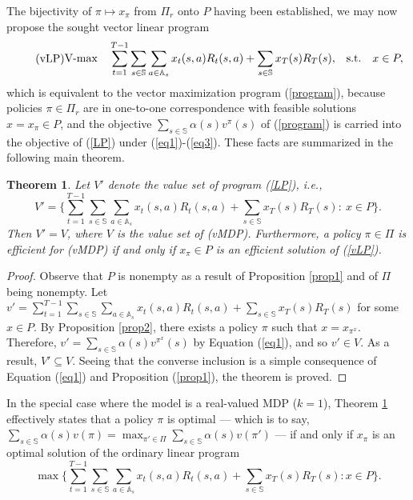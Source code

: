 \documentclass{article}
\newtheorem{theorem}{Theorem}[section]
\theoremstyle{definition}
\numberwithin{equation}{section}
\begin{document}
{The bijectivity of $\pi \mapsto x_\pi$ from $\Pi_r$ onto $P$ having been established,
we may now propose the sought vector
linear program
\begin{equation}
\tag{\mbox{${\rm vLP}$}}
\begin{aligned}
\label{LP}
\operatorname{V-max} \quad & \sum_{t = 1}^{T-1}\sum_{s \in \mathbb{S}}\sum_{a \in \mathbb{A}_s} x_{t}(s, a)R_t(s, a) + \sum_{s \in \mathbb{S}}x_{T}(s)R_T(s), & \textrm{s.t.} \quad & x \in P,\\
\end{aligned}
\end{equation} 
which is equivalent to the vector maximization program (\ref{program}), because policies $\pi\in \Pi_r$ are in one-to-one correspondence
with feasible solutions
$x=x_\pi \in P$, and the objective
$\sum_{s\in \mathbb{S}} \alpha(s) v^\pi(s)$
of (\ref{program}) is carried into the objective
of (\ref{LP}) under (\ref{eq1})-(\ref{eq3}).
These facts are summarized in the following main theorem.
\begin{theorem}
\label{centralthm}
Let $V'$ denote the value set of program {\rm (\ref{LP})}, i.e., \begin{equation*}V' = \biggl\{\sum_{t = 1}^{T-1}\sum_{s \in \mathbb{S}}\sum_{a \in \mathbb{A}_s} x_{t}(s, a)R_t(s, a) + \sum_{s \in \mathbb{S}}x_{T}(s)R_T(s):\ x \in P\biggr\}.\end{equation*} Then $V' = V$, where $V$ is the value set of {\rm (vMDP)}. Furthermore, a policy $\pi\in \Pi$ is efficient for {\rm (vMDP)} if and only if $x_{\pi}\in P$ is an efficient solution of {\rm (\ref{vLP})}. 
\end{theorem}

\begin{proof}
    Observe that $P$ is nonempty as a result of Proposition \ref{prop1} and of $\Pi$ being nonempty. Let $v' = \sum_{t = 1}^{T-1}\sum_{s \in \mathbb{S}}\sum_{a \in \mathbb{A}_s} x_{t}(s, a)R_t(s, a) + \sum_{s \in \mathbb{S}}x_{T}(s)R_T(s)$ for some $x \in P$. By Proposition \ref{prop2}, there exists a policy $\pi$ such that $x = x_{\pi^{x}}$. Therefore, $v' = \sum_{s \in \mathbb{S}}\alpha(s)v^{\pi^{x}}(s)$ by Equation (\ref{eq1}), and so $v' \in V$. As a result, $V' \subseteq V$. Seeing that the converse inclusion is a simple consequence of Equation (\ref{eq1}) and Proposition (\ref{prop1}), the theorem is proved.
\end{proof}

In the special case where the model is a real-valued MDP ($k = 1$), Theorem \ref{centralthm} effectively states that a policy $\pi$ is optimal --- which is to say, $\sum_{s \in \mathbb{S}}\alpha(s)v(\pi) = \max_{\pi' \in \Pi}\sum_{s \in \mathbb{S}}\alpha(s)v(\pi')$ --- if and only if $x_{\pi}$ is an optimal solution of the ordinary linear program \begin{equation*}\max \biggl\{\sum_{t = 1}^{T-1}\sum_{s \in \mathbb{S}}\sum_{a \in \mathbb{A}_s} x_{t}(s, a)R_t(s, a) + \sum_{s \in \mathbb{S}}x_{T}(s)R_T(s): x \in P \biggr\}.\end{equation*} 

}
\end{document}
